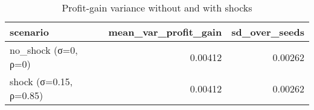 \begin{table}
\caption{Profit-gain variance without and with shocks}
\label{tab:volatility}
\begin{tabular}{lrr}
\toprule
scenario & mean_var_profit_gain & sd_over_seeds \\
\midrule
no_shock (σ=0, ρ=0) & 0.00412 & 0.00262 \\
shock (σ=0.15, ρ=0.85) & 0.00412 & 0.00262 \\
\bottomrule
\end{tabular}
\end{table}
